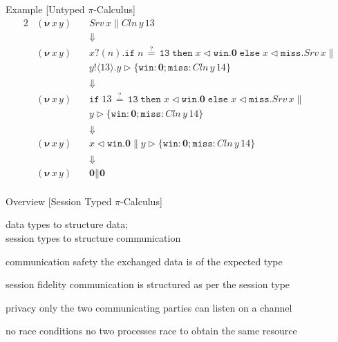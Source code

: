\documentclass[dvipsnames]{beamer}
\newcommand{\Picalc}{$\pi$-Calculus}
\newcommand{\PO}{\textbf{0}}
\newcommand{\comp}[2]{#1 \parallel #2}
\newcommand{\new}[2]{(\boldsymbol{\nu} \, #1 \, #2) \,}
\newcommand{\send}[2]{#1 !\langle #2 \rangle .}
\newcommand{\recv}[2]{#1 ?( #2 ) .}
\newcommand{\branch}[3]{#1 \triangleright \{ #2 \}_{#3}}
\newcommand{\select}[2]{#1 \triangleleft #2 .}
\newcommand{\slidetitle}[2]{#2 \hspace*{\fill} [#1]}
\begin{document}
  \begin{frame}{\slidetitle{Untyped \Picalc{}}{Example}}
    \vspace{-1em}
    \begin{alignat*}{2}
      & \new{x}{y} && \comp{Srv \, x}{Cln \, y \, 13} \\
      & && \Downarrow \\
      & \new{x}{y} && \comp{\recv{x}{n} \mathtt{if} \; n \, \mathtt{\stackrel{?}{=}} \, \mathtt{13} \; \mathtt{then} \; \select{x}{\mathtt{win}} \PO \; \mathtt{else} \; \select{x}{\mathtt{miss}} Srv \, x}{\\
      & && \send{y}{13} \branch{y}{ \mathtt{win} : \PO; \mathtt{miss} : Cln \, y \, 14}{}} \\
      & && \Downarrow \\
      & \new{x}{y} && \comp{\mathtt{if} \; 13 \, \mathtt{\stackrel{?}{=}} \, \mathtt{13} \; \mathtt{then} \; \select{x}{\mathtt{win}} \PO \; \mathtt{else} \; \select{x}{\mathtt{miss}} Srv \, x}{\\
      & && \branch{y}{ \mathtt{win} : \PO; \mathtt{miss} : Cln \, y \, 14}{}} \\
      & && \Downarrow \\
      & \new{x}{y} && \comp{\select{x}{\mathtt{win}} \PO}{\branch{y}{ \mathtt{win} : \PO; \mathtt{miss} : Cln \, y \, 14}{}} \\
      & && \Downarrow \\
      & \new{x}{y} && \comp{\PO}{\PO} \\
    \end{alignat*}
  \end{frame}
  

  \begin{frame}{\slidetitle{Session Typed \Picalc{}}{Overview}}
    \begin{center}
      data types to structure data;\\
      session types to structure communication
    \end{center}

    \begin{block}{communication safety}
      the exchanged data is of the expected type
    \end{block}
    \begin{block}{session fidelity}
      communication is structured as per the session type
    \end{block}
    \begin{block}{privacy}
      only the two communicating parties can listen on a channel
    \end{block}
    \begin{block}{no race conditions}
      no two processes race to obtain the same resource
    \end{block}
  \end{frame}
\end{document}
